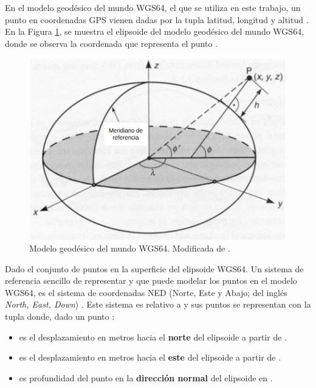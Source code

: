 En el modelo geodésico del mundo WGS64, el que se utiliza en este trabajo, un punto en coordenadas GPS vienen dadas por la tupla latitud, longitud y altitud  \cite{2002convertGPS}. En la Figura \ref{fig:WGS64}, se muestra el elipsoide del modelo geodésico del mundo WGS64, donde se observa la coordenada  que representa el punto .

\begin{figure}[H]
    \centering
    \includegraphics[scale=0.3]{partes/img/WGS64.png}
    \caption[Modelo geodésico del mundo WGS64.]{Modelo geodésico del mundo WGS64. Modificada de \cite{2002convertGPS}.} 
    \label{fig:WGS64}
\end{figure}

Dado  el conjunto de puntos en la superficie del elipsoide WGS64. Un sistema de referencia sencillo de representar y que puede modelar los puntos  en el modelo WGS64, es el sistema de coordenadas NED (Norte, Este y Abajo; del inglés \textit{North, East, Down}) \cite{cai2011coordinate}. Este sistema es relativo a  y sus puntos se representan con la tupla  donde, dado un punto :

\begin{itemize}
    \item {} es el desplazamiento en metros hacia el \textbf{norte} del elipsoide a partir de .
    \item {} es el desplazamiento en metros hacia el \textbf{este} del elipsoide a partir de .
    \item {} es profundidad del punto en la \textbf{dirección normal} del elipsoide en .
\end{itemize}


